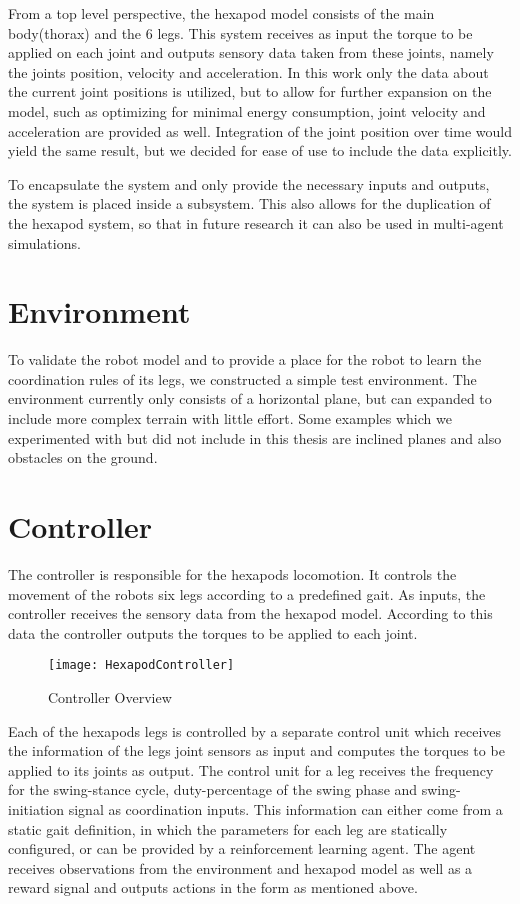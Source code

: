 From a top level perspective, the hexapod model consists of the main body(thorax) and the 6 legs.
This system receives as input the torque to be applied on each joint and outputs sensory data taken from these joints, namely the joints position, velocity and acceleration.
In this work only the data about the current joint positions is utilized, but to allow for further expansion on the model, such as optimizing for minimal energy consumption, joint velocity and acceleration are provided as well.
Integration of the joint position over time would yield the same result, but we decided for ease of use to include the data explicitly.

To encapsulate the system and only provide the necessary inputs and outputs, the system is placed inside a subsystem.
This also allows for the duplication of the hexapod system, so that in future research it can also be used in multi-agent simulations.

\section{Environment}
To validate the robot model and to provide a place for the robot to learn the coordination rules of its legs, we constructed a simple test environment.
The environment currently only consists of a horizontal plane, but can expanded to include more complex terrain with little effort.
Some examples which we experimented with but did not include in this thesis are inclined planes and also obstacles on the ground.

\section{Controller}
The controller is responsible for the hexapods locomotion.
It controls the movement of the robots six legs according to a predefined gait.
As inputs, the controller receives the sensory data from the hexapod model.
According to this data the controller outputs the torques to be applied to each joint.

\begin{figure}
	\centerline{\texttt{[image: HexapodController]}}
	\caption{Controller Overview}
	\label{Controller Overview}
\end{figure}
Each of the hexapods legs is controlled by a separate control unit which receives the information of the legs joint sensors as input and computes the torques to be applied to its joints as output.
The control unit for a leg receives the frequency for the swing-stance cycle, duty-percentage of the swing phase and swing-initiation signal as coordination inputs.
This information can either come from a static gait definition, in which the parameters for each leg are statically configured, or can be provided by a reinforcement learning agent.
The agent receives observations from the environment and hexapod model as well as a reward signal and outputs actions in the form as mentioned above.






